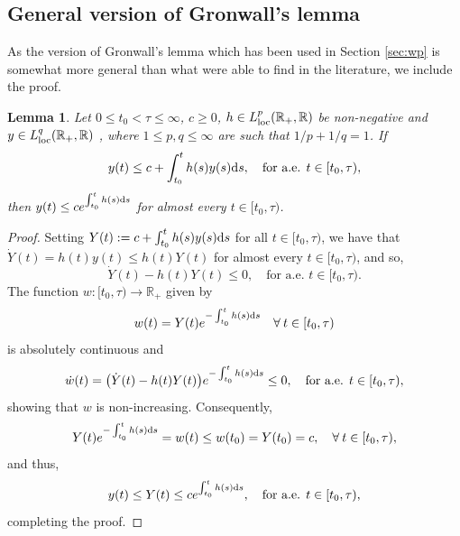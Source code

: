 \documentclass[a4paper,11pt]{article}
\newcommand{\R}{\mathbb R}
\numberwithin{equation}{section}
\numberwithin{figure}{section}
\numberwithin{table}{section}
\newtheorem{lemma}[theorem]{Lemma}
\begin{document}
\subsection{General version of Gronwall's lemma}
%
As the version of Gronwall's lemma which has been used in Section \ref{sec:wp} is somewhat more general than what were able to find in the literature, we include the proof.
%
\begin{lemma}\label{lem_a:gronwall}
Let $0\leq t_0<\tau\leq\infty$, $c\geq 0$, $h\in L^p_{\rm loc}(\R_+,\R)$ be non-negative and
$y\in L^q_{\rm loc}(\R_+,\R)$ , where $1\leq p,q\leq\infty$ are such that $1/p+1/q=1$. If
\[
y(t)\leq c+\int_{t_0}^t h(s)y(s){\rm d}s,\quad\mbox{for a.e. $t\in[t_0,\tau)$},
\]
then $y(t)\leq ce^{\int_{t_0}^t h(s){\rm d}s}$ for almost every $t\in[t_0,\tau)$.
\end{lemma}
%
\begin{proof}
Setting $Y(t):=c+\int_{t_0}^t h(s)y(s){\rm d}s$ for all $t\in[t_0,\tau)$,
we have that $\dot Y(t)=h(t)y(t)\leq h(t)Y(t)$ for almost every $t\in[t_0,\tau)$, and so,
\[
\dot Y(t)-h(t)Y(t)\leq 0, \quad\mbox{for a.e. $t\in[t_0,\tau)$}.
\]
The function $w:[t_0,\tau)\to\R_+$ given by
\[
w(t)=Y(t)e^{-\int_{t_0}^t h(s){\rm d}s}\quad\forall\:t\in[t_0,\tau)
\]
is absolutely continuous and
\[
\dot w(t)=\big(\dot Y(t)-h(t)Y(t)\big)e^{-\int_{t_0}^t h(s){\rm d}s}\leq 0,
\quad\mbox{for a.e. $t\in[t_0,\tau)$},
\]
showing that $w$ is non-increasing. Consequently,
\[
Y(t)e^{-\int_{t_0}^t h(s){\rm d}s}=w(t)\leq w(t_0)=Y(t_0)=c,
\quad\forall\:t\in[t_0,\tau),
\]
and thus,
\[
y(t)\leq Y(t)\leq ce^{\int_{t_0}^t h(s){\rm d}s},\quad\mbox{for a.e. $t\in[t_0,\tau)$},
\]
completing the proof.
\end{proof}
%
\end{document}
